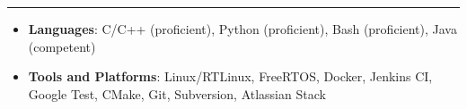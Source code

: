 \documentclass[10pt,letterpaper]{article}
\begin{document}
\smallskip \hrule \smallskip

\begin{itemize}[topsep=0pt]
    \setlength\itemsep{0.2em}
    \item \textbf{Languages}: C/C++ (proficient),
                              Python (proficient),
                              Bash (proficient),
                              Java (competent)
    \item \textbf{Tools and Platforms}: Linux/RTLinux,
                                        FreeRTOS,
                                        Docker,
                                        Jenkins CI,
                                        Google Test,
                                        CMake,
                                        Git,
                                        Subversion,
                                        Atlassian Stack
\end{itemize}
\end{document}
